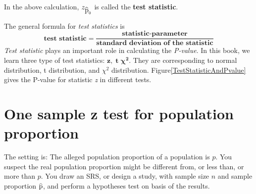 \documentclass[a4paper, 12pt,twoside]{book}
\newcommand\reallywidehat[1]{%
\savestack{\tmpbox}{\stretchto{%
  \scaleto{%
    \scalerel*[\widthof{\ensuremath{#1}}]{\kern-.6pt\bigwedge\kern-.6pt}%
    {\rule[-\textheight/2]{1ex}{\textheight}}%
  }{\textheight}%
}{0.5ex}}%
\stackon[1pt]{#1}{\tmpbox}%
}
\begin{document}
\begin{itemize}
 In the above calculation, $z_{\reallywidehat{p}_0}$ is called the \textbf{test statistic}. \vspace{0.3cm}
 
 
\colorbox{babypink}{\parbox{\textwidth}{
The general formula for \textit{test statistics} is 
$$\textbf{test statistic} = \frac{\textbf{statistic-parameter}}{\textbf{standard deviation of the statistic}}$$
\textit{Test statistic} plays an important role in calculating the \textit{P-value}. In this book, we learn three type of test statistics: $\mathbf{z,\;t\;\chi^2}$. They are corresponding to normal distribution, t distribution, and $\chi^2$ distribution.
Figure\ref{TestStatisticAndPvalue} gives the P-value for statistic \textit{z} in different tests.}}
\end{itemize}
\newpage

\section{One sample z test for population proportion}

The setting is: The alleged population proportion of a population is  $p$. You suspect the real population proportion might be different from, or less than, or more than $p$. You draw an SRS, or design a study, with sample size $n$ and sample proportion $\reallywidehat{p}$, and perform a hypotheses test on basis of the results.\vspace{0.6cm}
\end{document}
